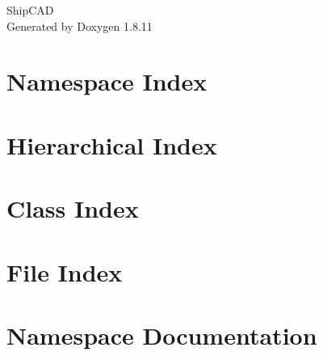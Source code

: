 \documentclass[twoside]{book}
\newcommand{\+}{\discretionary{\mbox{\scriptsize$\hookleftarrow$}}{}{}}
\newcommand{\clearemptydoublepage}{%
  \newpage{\pagestyle{empty}\cleardoublepage}%
}
\begin{document}
\hypersetup{pageanchor=false,
             bookmarksnumbered=true,
             pdfencoding=unicode
            }
\begin{titlepage}
\vspace*{7cm}
\begin{center}%
{\Large Ship\+C\+AD }\\
\vspace*{1cm}
{\large Generated by Doxygen 1.8.11}\\
\end{center}
\end{titlepage}
\clearemptydoublepage
\tableofcontents
\clearemptydoublepage
{}
\hypersetup{pageanchor=true}

\chapter{Namespace Index}

\chapter{Hierarchical Index}

\chapter{Class Index}

\chapter{File Index}

\chapter{Namespace Documentation}

\end{document}
